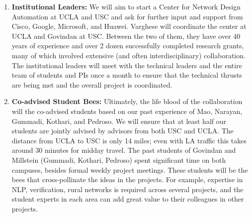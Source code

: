 \documentclass[10pt]{article}
\begin{document}
{\begin{enumerate}
Each is excited about leading and coordination their technical
thrusts across projects: Netravali will lead the project on mapping from operator concerns to
network DSL queries but he will participate the in the router primitive project with Tamir and
Varghese to  integrate from high level queries down  to router primitives.  He will also work
with Govindan and Varghese on automatically mining long term insights from operator logs which requires harnessing NLP as does the debugging thrust.

Raghavan will lead and coordinate the topology design (with Govindan and Varghese) and scripting (with Govindan, Millstein, and Varghese) starting with Motech and moving to Grameen.  Funds have been allocated for foreign travel to coordinate with Grameen and our collaborator Ashwin Gumaste in IIT Mumbai who will help us with a telesurgery application on his platform in IIT Mumbai.

\item \textbf{Institutional Leaders:} We will aim to start a Center for Network Design Automation
at UCLA and USC and ask for further input and support from Cisco, Google, Microsoft, and Huawei.
Varghese will coordinate the center at UCLA and Govindan at USC.  Between the two of them, they have over 40 years of experience and over 2 dozen successfully completed research grants, many
of which involved extensive (and often interdisciplinary) collaboration.  The institutional leaders
will meet with the technical leaders and the entire team of students and PIs once a month to ensure that the technical thrusts are being met and the overall project is coordinated.



\item \textbf{Co-advised Student Bees:} Ultimately, the life blood of the collaboration will the co-advised students based on our past experience of Mao, Narayan, Gummadi, Kothari, and Pedroso.  We will ensure that at least half our students are jointly advised by advisors from both USC and
UCLA.  The distance from UCLA to USC is only 14 miles; even with LA traffic this takes around 30 minutes for midday travel.  The past students of Govindan and Millstein (Gummadi, Kothari, Pedroso) spent significant time on both campuses, besides formal weekly project meetings.  
These students will be the bees that cross-pollinate the ideas in the projects.  For example, 
expertise in NLP, verification, rural networks is required across several projects, and the student
experts in each area can add great value to their colleagues in other projects.


\end{enumerate}}
\end{document}

